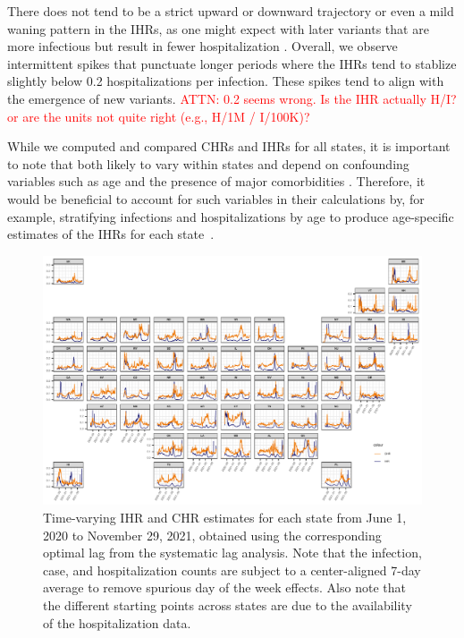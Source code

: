 \documentclass{article}
\newcommand{\attn }[1]{\textcolor{red}{ATTN: #1}}
\begin{document}
There does not tend to be a strict upward or downward trajectory or even a
mild waning pattern in the IHRs, as one might expect with later variants that are
more infectious but result in fewer hospitalization
\citep{lorenzo2022covid, blauer2022compare}. Overall, we observe intermittent
spikes that punctuate longer periods where the IHRs tend to stablize slightly below 0.2
hospitalizations per infection. These spikes tend to align with the emergence of
new variants. \attn{0.2 seems wrong. Is the IHR actually H/I? or are the units
not quite right (e.g., H/1M / I/100K)?}

While we computed and compared CHRs and IHRs for all states, it is important to
note that both likely to vary within states and depend on confounding variables
such as age and the presence of major comorbidities
\citep{russell2023comorbidities}. Therefore, it would be beneficial to account
for such variables in their calculations by, for example, stratifying infections
and hospitalizations by age to produce age-specific estimates of the IHRs for
each state~\citep{fox2023disproportionate}.



\begin{figure}[!tb]
\centering
\includegraphics[width=.99\linewidth]{IHR_7dav_F24.pdf}
\caption{Time-varying IHR and CHR estimates for each state from June 1, 2020
to November 29, 2021, obtained using the corresponding optimal lag from the
systematic lag analysis. Note that the infection, case, and hospitalization
counts are subject to a center-aligned 7-day average to remove spurious day
of the week effects. Also note that the different starting points across
states are due to the availability of the hospitalization data.}
\label{fig:IHR_7dav}
\end{figure}
\end{document}
